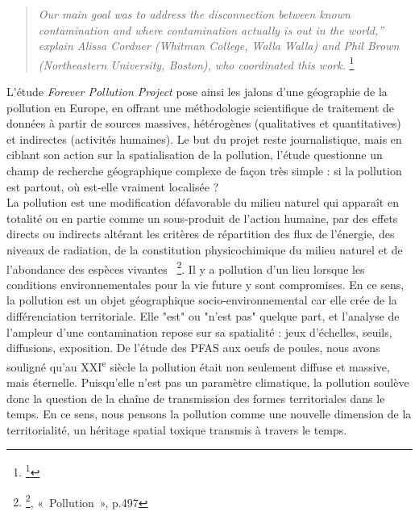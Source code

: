 \documentclass[a4paper,twoside,12pt]{book}
\newcommand{\siecle}[1]{\textsc{#1}\textsuperscript{e} siècle}
\begin{document}
\begin{quote}
\textit{\og{} Our main goal was to address the disconnection between known contamination and where contamination actually is out in the world,” explain Alissa Cordner (Whitman College, Walla Walla) and Phil Brown (Northeastern University, Boston), who coordinated this work.\fg{}} \footnote{\footcite{horel_stephane_methodology_2023}}
\end{quote}

L'étude \textit{Forever Pollution Project} pose ainsi les jalons d'une géographie de la pollution en Europe, en offrant une méthodologie scientifique de traitement de données à partir de sources massives, hétérogènes (qualitatives et quantitatives) et indirectes (activités humaines). Le but du projet reste journalistique, mais en ciblant son action sur la spatialisation de la pollution, l'étude questionne un champ de recherche géographique complexe de façon très simple : si la pollution est partout, où est-elle vraiment localisée ?  \\
	
La pollution est une \og{} modification défavorable du milieu naturel qui apparaît en totalité ou en partie comme un sous-produit de l’action humaine, par des effets directs ou indirects altérant les critères de répartition des flux de l’énergie, des niveaux de radiation, de la constitution physicochimique du milieu naturel et de l’abondance des espèces vivantes \fg{} \footnote{\footcite{collectif_dictionnaire_2024}, « Pollution », p.497}. Il y a pollution d'un lieu lorsque les conditions environnementales pour la vie future y sont compromises. En ce sens, la pollution est un objet géographique socio-environnemental car elle crée de la différenciation territoriale. Elle "est" ou "n'est pas" quelque part, et l'analyse de l'ampleur d'une contamination repose sur sa spatialité : jeux d'échelles,  seuils,  diffusions, exposition. De l'étude des PFAS aux oeufs de poules, nous avons souligné qu'au \siecle{XXI} la pollution était non seulement diffuse et massive, mais éternelle. Puisqu'elle n'est pas un paramètre climatique, la pollution soulève donc la question de la chaîne de transmission des formes territoriales dans le temps. En ce sens, nous pensons la pollution comme une nouvelle dimension de la territorialité, un héritage spatial toxique transmis à travers le temps. \\
\end{document}
